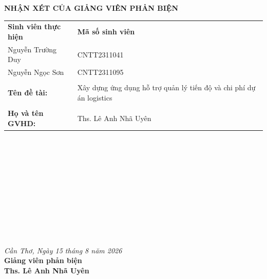 \newpage
{}
{}

\begin{center}
    \textbf{\Large NHẬN XÉT CỦA GIẢNG VIÊN PHẢN BIỆN}
\end{center}

\vspace{1cm}

\begin{table}[h]
\begin{tabular}{ll}
\textbf{Sinh viên thực hiện} & \textbf{Mã số sinh viên} \\
Nguyễn Trường Duy            & CNTT2311041              \\
Nguyễn Ngọc Sơn              & CNTT2311095             \\

                           &                          \\
\textbf{Tên đề tài:}       & Xây dựng ứng dụng hỗ trợ quản lý tiến độ và chi phí dự án logistics \\
                           &                          \\
\textbf{Họ và tên GVHD:}   & Ths. Lê Anh Nhã Uyên     \\
\end{tabular}
\end{table}

\vspace{0.5cm}
\noindent\makebox[\linewidth]{\dotfill} \\
\noindent\makebox[\linewidth]{\dotfill} \\
\noindent\makebox[\linewidth]{\dotfill} \\
\noindent\makebox[\linewidth]{\dotfill} \\
\noindent\makebox[\linewidth]{\dotfill} \\
\noindent\makebox[\linewidth]{\dotfill} \\
\noindent\makebox[\linewidth]{\dotfill} \\
\noindent\makebox[\linewidth]{\dotfill} \\
\noindent\makebox[\linewidth]{\dotfill} \\
\noindent\makebox[\linewidth]{\dotfill} \\
\noindent\makebox[\linewidth]{\dotfill}

\vspace{1cm}

\begin{flushright}
    \textit{Cần Thơ, Ngày 15 tháng 8 năm 2026} \\
    \textbf{Giảng viên phản biện} \\
    \vspace{2cm}
    \textbf{Ths. Lê Anh Nhã Uyên}
\end{flushright}